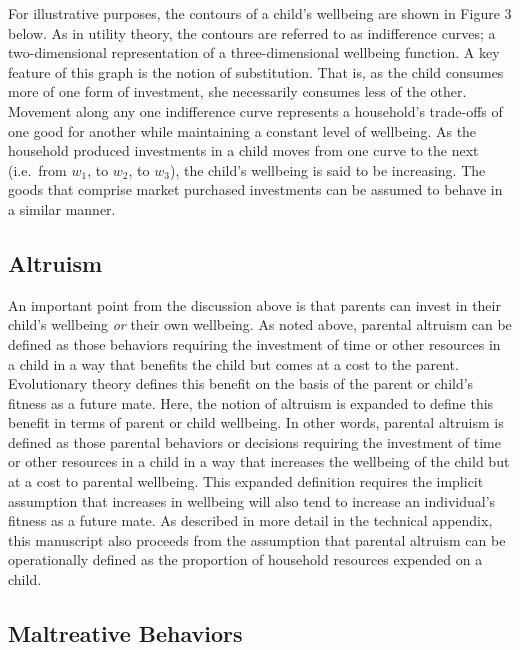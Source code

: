 \documentclass[]{elsarticle}
\begin{document}
For illustrative purposes, the contours of a child's wellbeing are shown
in Figure 3 below. As in utility theory, the contours are referred to as
indifference curves; a two-dimensional representation of a
three-dimensional wellbeing function. A key feature of this graph is the
notion of substitution. That is, as the child consumes more of one form
of investment, she necessarily consumes less of the other. Movement
along any one indifference curve represents a household's trade-offs of
one good for another while maintaining a constant level of wellbeing. As
the household produced investments in a child moves from one curve to
the next (i.e.~from $w_1$, to $w_2$, to $w_3$), the child's wellbeing is
said to be increasing. The goods that comprise market purchased
investments can be assumed to behave in a similar manner.



\subsection{Altruism}\label{altruism}

An important point from the discussion above is that parents can invest
in their child's wellbeing \emph{or} their own wellbeing. As noted
above, parental altruism can be defined as those behaviors requiring the
investment of time or other resources in a child in a way that benefits
the child but comes at a cost to the parent. Evolutionary theory defines
this benefit on the basis of the parent or child's fitness as a future
mate. Here, the notion of altruism is expanded to define this benefit in
terms of parent or child wellbeing. In other words, parental altruism is
defined as those parental behaviors or decisions requiring the
investment of time or other resources in a child in a way that increases
the wellbeing of the child but at a cost to parental wellbeing. This
expanded definition requires the implicit assumption that increases in
wellbeing will also tend to increase an individual's fitness as a future
mate. As described in more detail in the technical appendix, this
manuscript also proceeds from the assumption that parental altruism can
be operationally defined as the proportion of household resources
expended on a child.

\subsection{Maltreative Behaviors}\label{maltreative-behaviors}
\end{document}
